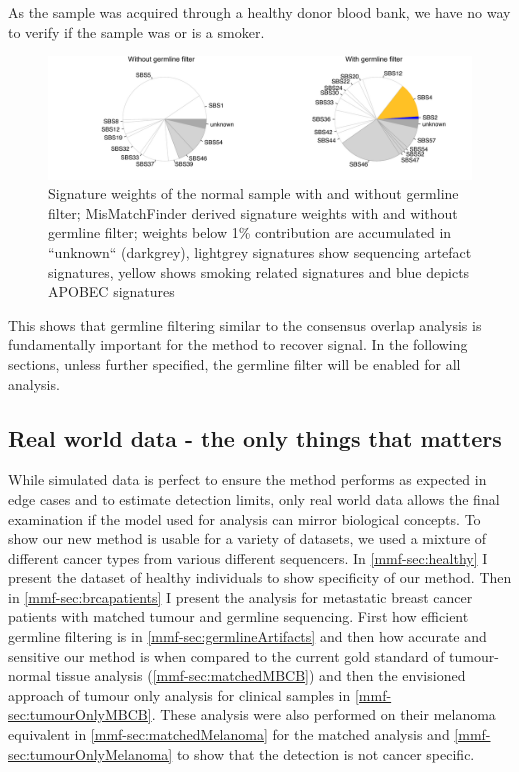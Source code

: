 As the sample was acquired through a healthy donor blood bank, we have no way to verify if the sample was or is a smoker.

\begin{figure}[!ht]
\centering
\includegraphics[width=.99\linewidth]{Figures/noGermlineFilterSignaturesPieChart.pdf}
\caption[Signature weights of the normal sample with and without germline filter]{Signature weights of the normal sample with and without germline filter; MisMatchFinder derived signature weights with and without germline filter; weights below 1\% contribution are accumulated in ``unknown`` (darkgrey), lightgrey signatures show sequencing artefact signatures, yellow shows smoking related signatures and blue depicts APOBEC signatures}\label{fig:mmf-noGermlinePie}
\end{figure}
 

This shows that germline filtering similar to the consensus overlap analysis is fundamentally important for the method to recover signal. In the following sections, unless further specified, the germline filter will be enabled for all analysis.





\subsection{Real world data - the only things that matters}
\label{mmf-sec:realworld}

While simulated data is perfect to ensure the method performs as expected in edge cases and to estimate detection limits, only real world data allows the final examination if the model used for analysis can mirror biological concepts. To show our new method is usable for a variety of datasets, we used a mixture of different cancer types from various different sequencers. In \autoref{mmf-sec:healthy} I present the dataset of healthy individuals to show specificity of our method. Then in \autoref{mmf-sec:brcapatients} I present the analysis for metastatic breast cancer patients with matched tumour and germline sequencing. First how efficient germline filtering is in \autoref{mmf-sec:germlineArtifacts} and then how accurate and sensitive our method is when compared to the current gold standard of tumour-normal tissue analysis (\autoref{mmf-sec:matchedMBCB}) and then the envisioned approach of tumour only analysis for clinical samples in \autoref{mmf-sec:tumourOnlyMBCB}.
These analysis were also performed on their melanoma equivalent in \autoref{mmf-sec:matchedMelanoma} for the matched analysis and \autoref{mmf-sec:tumourOnlyMelanoma} to show that the detection is not cancer specific.

